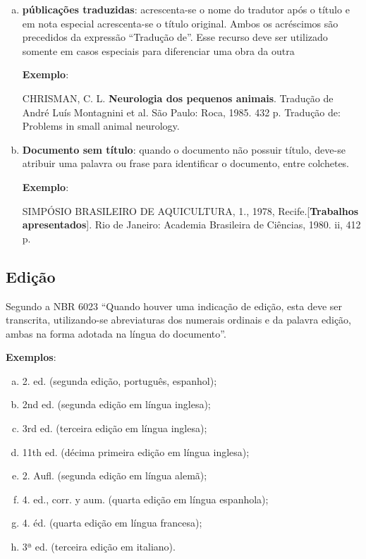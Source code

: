 \begin{enumerate}[a)]
  \item  \textbf{públicações traduzidas}: acrescenta-se o nome do tradutor após o título e em nota especial acrescenta-se o título original. Ambos os acréscimos são precedidos da expressão ``Tradução de''. Esse recurso deve ser utilizado somente em casos especiais para diferenciar uma obra da outra
  
\begin{exemplomanuallista}
\textbf{Exemplo}:\\
\begin{singlespace}
CHRISMAN, C. L. \textbf{Neurologia dos pequenos animais}. Tradução de André Luís Montagnini et al. São Paulo: Roca, 1985. 432 p. Tradução de: Problems in small animal neurology.
\end{singlespace}
\end{exemplomanuallista}

  \item  \textbf{Documento sem título}: quando o documento não possuir título, deve-se atribuir uma palavra ou frase para identificar o documento, entre colchetes.

\begin{exemplomanuallista}
\textbf{Exemplo}:\\
\begin{singlespace}
SIMPÓSIO BRASILEIRO DE AQUICULTURA, 1., 1978, Recife.[\textbf{Trabalhos apresentados}]. Rio de Janeiro: Academia Brasileira de Ciências, 1980. ii, 412 p.
\end{singlespace}
\end{exemplomanuallista}
\end{enumerate}


\subsection{Edição}

 Segundo a NBR 6023 \cite{NBR6023:2002} ``Quando houver uma indicação de edição, esta deve ser transcrita, utilizando-se abreviaturas dos numerais ordinais e da palavra edição, ambas na forma adotada na língua do documento''. 

\begin{exemplomanual}
\textbf{Exemplos}:

\begin{enumerate}[a)]
  \item  2. ed. (segunda edição, português, espanhol);
  \item  2nd ed. (segunda edição em língua inglesa);
  \item  3rd ed. (terceira edição em língua inglesa);
  \item  11th ed. (décima primeira edição em língua inglesa);
  \item  2. Aufl. (segunda edição em língua alemã);
  \item  4. ed., corr. y aum. (quarta edição em língua espanhola);
  \item  4. éd. (quarta edição em língua francesa);
  \item  3ª ed. (terceira edição em italiano).
\end{enumerate}
\end{exemplomanual}

